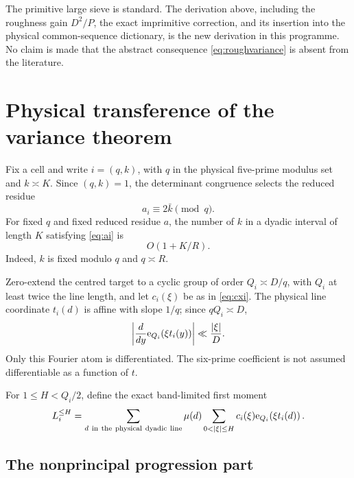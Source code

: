 \begin{remark}
The primitive large sieve is standard.  The derivation above, including the
roughness gain $D^2/P$, the exact imprimitive correction, and its insertion into
the physical common-sequence dictionary, is the new derivation in this
programme.  No claim is made that the abstract consequence
\cref{eq:roughvariance} is absent from the literature.
\end{remark}

\section{Physical transference of the variance theorem}\label{sec:transference}

Fix a cell and write $i=(q,k)$, with $q$ in the physical five-prime modulus set
and $k\asymp K$.  Since $(q,k)=1$, the determinant congruence selects the
reduced residue
\begin{equation}\label{eq:ai}
                        a_i\equiv2\bar k\pmod q.
\end{equation}
For fixed $q$ and fixed reduced residue $a$, the number of $k$ in a dyadic
interval of length $K$ satisfying \cref{eq:ai} is
\begin{equation}\label{eq:residue-multiplicity}
                        O(1+K/R).
\end{equation}
Indeed, $k$ is fixed modulo $q$ and $q\asymp R$.

Zero-extend the centred target to a cyclic group of order $Q_i\asymp D/q$,
with $Q_i$ at least twice the line length, and let $c_i(\xi)$ be as in
\cref{eq:cxi}.  The physical line coordinate $t_i(d)$ is affine with slope
$1/q$; since $qQ_i\asymp D$,
\begin{equation}\label{eq:phase-derivative}
 \left|\frac{d}{dy}\mathrm e_{Q_i}\!\left(\xi t_i(y)\right)\right|
                       \ll\frac{|\xi|}{D}.
\end{equation}
Only this Fourier atom is differentiated.  The six-prime coefficient is not
assumed differentiable as a function of $t$.

For $1\le H<Q_i/2$, define the exact band-limited first moment
\begin{equation}\label{eq:LleH}
 L_i^{\le H}=
 \sum_{\substack{d\ \mathrm{in\ the\ physical\ dyadic\ line}}}
 \mu(d)\sum_{0<|\xi|\le H}c_i(\xi)
                   \eord{Q_i}{\xi t_i(d)}.
\end{equation}

\subsection{The nonprincipal progression part}

